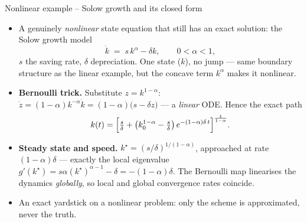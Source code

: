 \documentclass[11pt,aspectratio=169]{beamer}
\begin{document}
\begin{frame}{Nonlinear example -- Solow growth and its closed form}

\begin{itemize}

\item A genuinely \emph{nonlinear} state equation that still has an
  exact solution: the Solow growth model
  \[
  \dot k \;=\; s\,k^{\alpha} - \delta k,
  \qquad 0<\alpha<1,
  \]
  $s$ the saving rate, $\delta$ depreciation. One state ($k$), no jump
  — same boundary structure as the linear example, but the concave
  term $k^\alpha$ makes it nonlinear.

\item \textbf{Bernoulli trick.} Substitute $z = k^{1-\alpha}$:
  $\dot z = (1-\alpha)k^{-\alpha}\dot k = (1-\alpha)\bigl(s-\delta z\bigr)$
  — a \emph{linear} ODE. Hence the exact path
  \[
  k(t) = \Bigl[\tfrac{s}{\delta}
    + \bigl(k_0^{1-\alpha} - \tfrac{s}{\delta}\bigr)\,
      e^{-(1-\alpha)\delta\, t}\Bigr]^{\frac{1}{1-\alpha}}.
  \]

\item \textbf{Steady state and speed.} $k^\star=(s/\delta)^{1/(1-\alpha)}$,
  approached at rate $(1-\alpha)\delta$ — exactly the local eigenvalue
  $g'(k^\star)=s\alpha(k^\star)^{\alpha-1}-\delta=-(1-\alpha)\delta$. The
  Bernoulli map linearises the dynamics \emph{globally}, so local and
  global convergence rates coincide.

\item An exact yardstick on a nonlinear problem: only the scheme is
  approximated, never the truth.

\end{itemize}

\end{frame}
\end{document}
